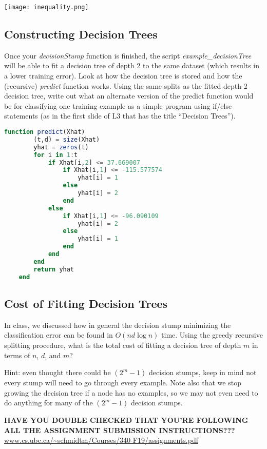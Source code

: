 \documentclass{article}
\def\blu#1{{\color{blu}#1}}
\begin{document}
\texttt{[image: inequality.png]}

\subsection{Constructing Decision Trees}

Once your \emph{decisionStump} function is finished, the script \emph{example\_decisionTree} will be able to fit a decision tree of depth 2 to the same dataset (which results in a lower training error). Look at how the decision tree is stored and how the (recursive) \emph{predict} function works. \blu{Using the same splits as the fitted depth-2 decision tree, write out what an alternate version of the predict function would be for classifying one training example as a simple program using if/else statements (as in the first slide of L3 that has the title ``Decision Trees'').}

\begin{lstlisting}[language=julia]
	function predict(Xhat)
		(t,d) = size(Xhat)
		yhat = zeros(t)
		for i in 1:t
			if Xhat[i,2] <= 37.669007
				if Xhat[i,1] <= -115.577574
					yhat[i] = 1
				else
					yhat[i] = 2
				end
			else
				if Xhat[i,1] <= -96.090109
					yhat[i] = 2
				else
					yhat[i] = 1
				end
			end
		end
		return yhat
	end
\end{lstlisting}

\subsection{Cost of Fitting Decision Trees}

In class, we discussed how in general the decision stump minimizing the classification error can be found in $O(nd\log n)$ time. Using the greedy recursive splitting procedure, \blu{what is the total cost of fitting a decision tree of depth $m$ in terms of $n$, $d$, and $m$?} 

Hint: even thought there could be $(2^m-1)$ decision stumps, keep in mind not every stump will need to go through every example. Note also that we stop growing the decision tree if a node has no examples, so we may not even need to do anything for many of the $(2^m-1)$ decision stumps.

\vspace{25pt}
\textbf{HAVE YOU DOUBLE CHECKED THAT YOU'RE FOLLOWING ALL THE ASSIGNMENT SUBMISSION INSTRUCTIONS???}\\
\url{www.cs.ubc.ca/~schmidtm/Courses/340-F19/assignments.pdf}
\end{document}
